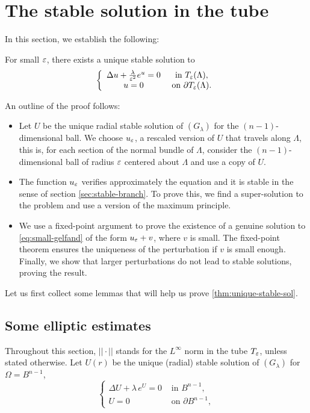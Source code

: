 \section{The stable solution in the tube}
\label{sec:stable-sol-in-tube}

In this section, we establish the following:

\begin{theorem}
\label{thm:unique-stable-sol}
For small $\varepsilon$, there exists a unique stable solution to
\begin{equation}
\label{eq:small-gelfand}
\left\{
\begin{array}{cc}
\Delta u + \frac{\lambda}{\varepsilon^2}e^u=0 & \mbox{ in }T_\varepsilon(\Lambda),\\
u = 0 & \mbox{ on }\partial T_\varepsilon(\Lambda).
\end{array}
\right.
\end{equation}
\end{theorem}

\noindent An outline of the proof follows:

\begin{itemize}
\item Let $U$ be the unique radial stable solution of $(G_\lambda)$ for the
$(n-1)$-dimensional ball. We choose $u_\varepsilon$, a rescaled version of $U$ that
travels along $\Lambda$, this is, for each section of the normal
bundle of $\Lambda$, consider the $(n-1)$-dimensional ball of radius $\varepsilon$
centered about $\Lambda$ and use a copy of $U$.
\item The function $u_\varepsilon$ verifies approximately the equation and it is stable
in the sense of section \ref{sec:stable-branch}. To prove this, we find a
super-solution to the problem and use a version of the maximum principle.
\item We use a fixed-point argument to prove the existence of a genuine solution
to \ref{eq:small-gelfand} of the form $u_\varepsilon+v$, where $v$ is small. The
fixed-point theorem ensures the uniqueness of the perturbation if $v$ is small
enough. Finally, we show that larger perturbations do not lead to stable
solutions, proving the result.
\end{itemize}

Let us first collect some lemmas that will help us prove
\ref{thm:unique-stable-sol}.
\subsection{Some elliptic estimates}
Throughout this section, $||\cdot||$
stands for the $L^\infty$ norm in the tube
$T_\varepsilon$, unless stated otherwise. Let $U(r)$ be the unique (radial) stable
solution of $(G_\lambda)$ for $\Omega
= B^{n-1}$, \ie
\begin{equation}
\left\{\begin{array}{cc}
\Delta U + \lambda\, e^U=0 & \mbox{ in }B^{n-1},\\
U = 0 & \mbox{ on }\partial B^{n-1},
\end{array}\right.
\end{equation}

